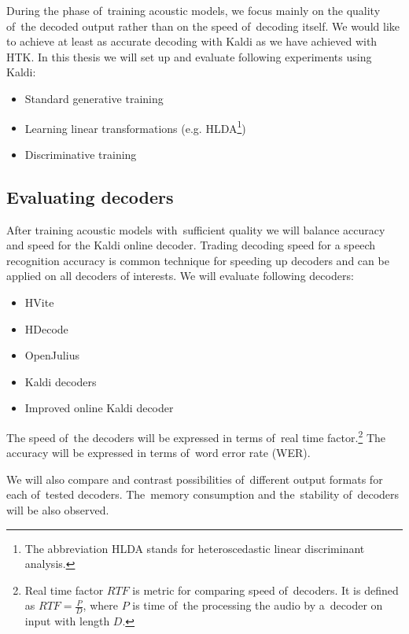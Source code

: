 During the phase of~training acoustic models, we focus mainly on the quality of~the decoded output rather than on the speed of~decoding itself. 
We would like to achieve at least as accurate decoding with Kaldi as we have achieved with HTK. In this thesis we will set up and evaluate following experiments using Kaldi:
\begin{itemize}
    \item Standard generative training
    \item Learning linear transformations (e.g. HLDA\footnote{The abbreviation HLDA stands for heteroscedastic linear discriminant analysis.})
    \item Discriminative training 
\end{itemize}
 

\subsection{Evaluating decoders} 
\label{sub:compare_rt}
After training acoustic models with~sufficient quality we will balance accuracy and speed for the Kaldi online decoder. Trading decoding speed for a speech recognition accuracy is common technique for speeding up decoders and can be applied on all decoders of interests. We will evaluate following decoders:
\begin{itemize}
    \item HVite  %
    \item HDecode %
    \item OpenJulius %
    \item Kaldi decoders
    \item Improved online Kaldi decoder
\end{itemize}

The speed of~the decoders will be expressed in terms of~real time factor.\footnote{Real time factor $RTF$ is metric for comparing speed of~decoders. It is defined as $RTF = \frac{P}{D}$, where $P$ is time of~the processing the audio by a~decoder on input with length $D$.} The accuracy will be expressed in terms of~word error rate (WER).

We will also compare and contrast possibilities of~different output formats for each of~tested decoders. The~memory consumption and the~stability of~decoders will be also observed. 


